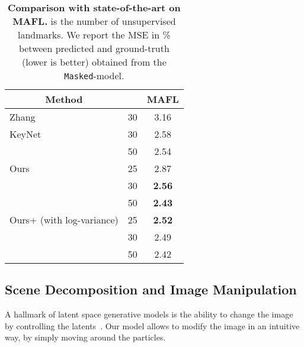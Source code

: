 \documentclass[nohyperref]{article}
\theoremstyle{plain}
\theoremstyle{definition}
\theoremstyle{remark}
\begin{document}
\begin{table}
\setlength{\tabcolsep}{4pt}
    \centering
    \begin{small}
    \begin{tabular}{@{}llc@{}}
    \toprule
    \multicolumn{1}{c}{Method}                    &   & MAFL        \\ \midrule
    Zhang~\citep{zhang2018kp}            & 30   & 3.16                           \\
    KeyNet~\citep{jakab2018unsupervised}   & 30 &   2.58                            \\
                                            & 50 & 2.54                             \\ \midrule
    Ours                                    & 25   & 2.87                         \\
                                            & 30   & \textbf{2.56}                            \\
                                            & 50   & \textbf{2.43}                          \\ \midrule
    Ours+ (with log-variance)               & 25   & \textbf{2.52}                         \\
                                            & 30   & 2.49                            \\
                                            & 50   & 2.42                          \\ \bottomrule
    \end{tabular}
    \end{small}
    \caption{{\bf Comparison with state-of-the-art on MAFL.}  is the number of unsupervised landmarks. We report the MSE in \% between predicted and ground-truth (lower is better) obtained from the \texttt{Masked}-model.}
    \label{tab:face-sota}
    \vspace{-2em}
\end{table}



\subsection{Scene Decomposition and Image Manipulation}
\label{subsec:manip}
A hallmark of latent space generative models is the ability to change the image by controlling the latents~\citep{daniel2020soft, karras2020analyzing}.
Our model allows to modify the image in an intuitive way, by simply moving around the particles.
\end{document}
